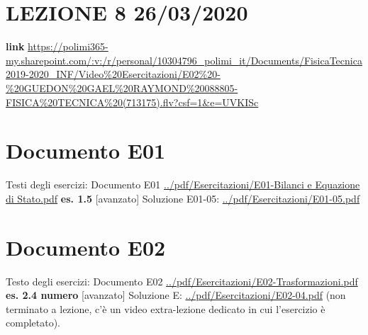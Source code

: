\section*{LEZIONE 8 26/03/2020}
\textbf{link} \url{https://polimi365-my.sharepoint.com/:v:/r/personal/10304796_polimi_it/Documents/FisicaTecnica2019-2020_INF/Video%20Esercitazioni/E02%20-%20GUEDON%20GAEL%20RAYMOND%20088805-FISICA%20TECNICA%20(713175).flv?csf=1&e=UVKISc}
\section*{Documento E01}
Testi degli esercizi:\newline
Documento E01 \url{../pdf/Esercitazioni/E01-Bilanci e Equazione di Stato.pdf}\newline
\newline
\textbf{es. 1.5} [avanzato]\newline
Soluzione E01-05: \url{../pdf/Esercitazioni/E01-05.pdf}
\section*{Documento E02}
Testo degli esercizi:\newline
Documento E02 \url{../pdf/Esercitazioni/E02-Trasformazioni.pdf}\newline
\newline
\textbf{es. 2.4 numero} [avanzato]\newline
Soluzione E: \url{../pdf/Esercitazioni/E02-04.pdf} (non terminato a lezione, c'è un video extra-lezione dedicato in cui l'esercizio è completato).